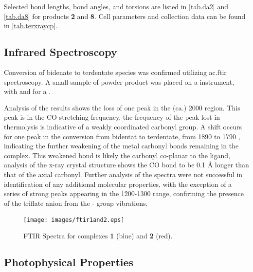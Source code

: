 Selected bond lengths, bond angles, and torsions are listed in \autoref{tab.da2} and \autoref{tab.da8} for products \textbf{2} and \textbf{8}. Cell parameters and collection data can be found in \autoref{tab.terxraycp}. 



\subsection{Infrared Spectroscopy}

Conversion of bidenate to terdentate species was confirmed utilizing \gls{ac.ftir} spectroscopy. A small sample of powder product was placed on a  instrument, with and for a .

Analysis of the results shows the loss of one peak in the (ca.) 2000  region. This peak is in the CO stretching frequency, the frequency of the peak lost in thermolysis is indicative of a weakly coordinated carbonyl group. A shift occurs for one peak in the conversion from bidentat to terdentate, from 1890 to 1790 , indicating the further weakening of the metal carbonyl bonds remaining in the complex. This weakened bond is likely the carbonyl co-planar to the ligand, analysis of the x-ray crystal structure shows the CO bond to be 0.1 \r{A} longer than that of the axial carbonyl. Further analysis of the spectra were not successful in identification of any additional molecular properties, with the exception of a series of strong peaks appearing in the 1200-1300  range, confirming the presence of the triflate anion from the - group vibrations. 

\begin{figure}[!htbp]
 \begin{center}
  \texttt{[image: images/ftir1and2.eps]}
 \end{center}
\caption[FTIR Spectra for complexes \textbf{1} and \textbf{2}]{FTIR Spectra for complexes \textbf{1} (blue) and \textbf{2} (red).}
\label{fig.ir1}
\end{figure} 

\subsection{Photophysical Properties}

